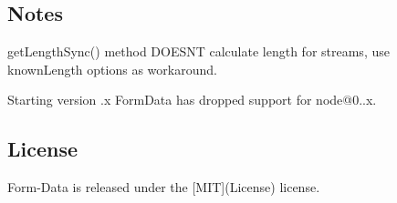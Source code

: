 \subsection*{Notes}


\begin{DoxyItemize}
\item {\ttfamily get\+Length\+Sync()} method D\+O\+E\+SN\textquotesingle{}T calculate length for streams, use {\ttfamily known\+Length} options as workaround.
\item Starting version {.\+x} Form\+Data has dropped support for {\ttfamily node@0..\+x}.
\end{DoxyItemize}

\subsection*{License}

Form-\/\+Data is released under the \mbox{[}M\+IT\mbox{]}(License) license. 